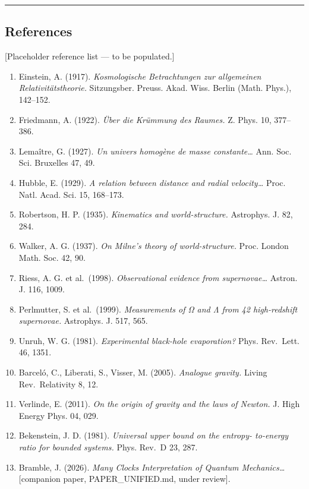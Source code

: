 \documentclass[
]{article}
\begin{document}
\begin{center}\rule{0.5\linewidth}{0.5pt}\end{center}

\subsection{References}\label{references}

{[}Placeholder reference list --- to be populated.{]}

\begin{enumerate}
\def\labelenumi{\arabic{enumi}.}
\item
  Einstein, A. (1917). \emph{Kosmologische Betrachtungen zur allgemeinen
  Relativitätstheorie.} Sitzungsber. Preuss. Akad. Wiss. Berlin (Math.
  Phys.), 142--152.
\item
  Friedmann, A. (1922). \emph{Über die Krümmung des Raumes.} Z. Phys.
  10, 377--386.
\item
  Lemaître, G. (1927). \emph{Un univers homogène de masse
  constante\ldots{}} Ann. Soc. Sci. Bruxelles 47, 49.
\item
  Hubble, E. (1929). \emph{A relation between distance and radial
  velocity\ldots{}} Proc. Natl. Acad. Sci. 15, 168--173.
\item
  Robertson, H. P. (1935). \emph{Kinematics and world-structure.}
  Astrophys. J. 82, 284.
\item
  Walker, A. G. (1937). \emph{On Milne's theory of world-structure.}
  Proc. London Math. Soc. 42, 90.
\item
  Riess, A. G. et al.~(1998). \emph{Observational evidence from
  supernovae\ldots{}} Astron. J. 116, 1009.
\item
  Perlmutter, S. et al.~(1999). \emph{Measurements of Ω and Λ from 42
  high-redshift supernovae.} Astrophys. J. 517, 565.
\item
  Unruh, W. G. (1981). \emph{Experimental black-hole evaporation?} Phys.
  Rev.~Lett. 46, 1351.
\item
  Barceló, C., Liberati, S., Visser, M. (2005). \emph{Analogue gravity.}
  Living Rev.~Relativity 8, 12.
\item
  Verlinde, E. (2011). \emph{On the origin of gravity and the laws of
  Newton.} J. High Energy Phys. 04, 029.
\item
  Bekenstein, J. D. (1981). \emph{Universal upper bound on the entropy-
  to-energy ratio for bounded systems.} Phys. Rev.~D 23, 287.
\item
  Bramble, J. (2026). \emph{Many Clocks Interpretation of Quantum
  Mechanics\ldots{}} {[}companion paper, PAPER\_UNIFIED.md, under
  review{]}.
\end{enumerate}
\end{document}
